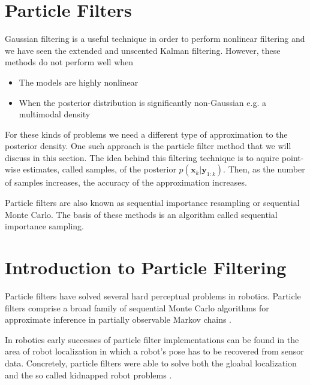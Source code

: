 \section{Particle Filters}
\label{particle_filters}

Gaussian filtering is a useful technique in order to perform nonlinear filtering and we have seen
the extended and unscented Kalman filtering. However, these methods do not perform well when

\begin{itemize}
\item The models are highly nonlinear
\item When the posterior distribution is significantly non-Gaussian e.g. a multimodal density
\end{itemize}


For these kinds of problems we need a different type of approximation to the posterior density. One such approach is the particle filter
method that we will discuss in this section. The idea behind this filtering technique is  to aquire point-wise
estimates, called samples, of the posterior $p(\mathbf{x}_k | \mathbf{y}_{1:k})$. Then, as the number of samples increases,
the accuracy of the approximation increases. 


\begin{framed}
\theoremstyle{remark}
\begin{remark}{}

Particle filters are also known as sequential importance resampling or sequential Monte Carlo.
The basis of these methods is an algorithm called  sequential importance sampling.
\end{remark}
\end{framed}

\section{Introduction to Particle Filtering }
\label{particle_filter_introduction}

Particle filters have solved several hard perceptual problems in robotics. Particle filters comprise a broad family of sequential Monte Carlo algorithms for 
approximate inference in partially observable Markov chains \cite{Thurn2002}. 

In robotics early successes of particle filter implementations can be found in the area of robot localization in which a robot's pose
has to be recovered from sensor data. Concretely, particle filters were able to solve both the gloabal localization and the so called
kidnapped robot problems \cite{Thurn2002}.


